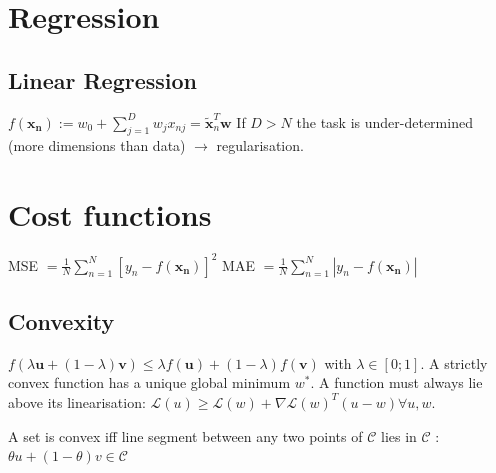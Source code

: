 \section{Regression}
\subsection{Linear Regression}
$f(\mathbf{x_n}) := w_0 + \sum_{j=1}^D w_j x_{nj} = \tilde{\mathbf{x}}_n^T \mathbf{w}$\newline
If $D > N$ the task is under-determined (more dimensions than data) $\rightarrow$ regularisation.

\section{Cost functions}
MSE $= \frac{1}{N} \sum_{n=1}^N [y_n - f(\mathbf{x_n})]^2$ \newline
MAE $= \frac{1}{N} \sum_{n=1}^N |y_n - f(\mathbf{x_n})|$\newline
\subsection{Convexity}
$f(\lambda \mathbf{u} + (1-\lambda)\mathbf{v}) \le \lambda f(\mathbf{u}) + (1-\lambda) f(\mathbf{v})$ with $\lambda \in [0;1]$.
A strictly convex function has a unique global minimum $w^*$. 
A function must always lie above its linearisation: \newline $\mathcal{L}(u) \ge \mathcal{L}(w) + \nabla \mathcal{L}(w)^T (u-w) \forall u,w$.

A set is convex iff line segment between any two points of $\mathcal{C}$ lies in $\mathcal{C}$ : $\theta u + (1 - \theta) v \in \mathcal{C}$

